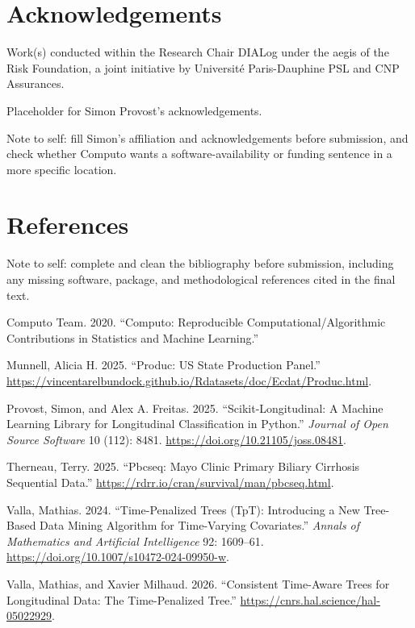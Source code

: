\documentclass[
  letterpaper,
  DIV=11,
  numbers=noendperiod]{scrartcl}
\newlength{\cslhangindent}
\newenvironment{CSLReferences}[2] %
 {\begin{list}{}{%
  \setlength{\itemindent}{0pt}
  \setlength{\leftmargin}{0pt}
  \setlength{\parsep}{0pt}
  \ifodd #1
   \setlength{\leftmargin}{\cslhangindent}
   \setlength{\itemindent}{-1\cslhangindent}
  \fi
  \setlength{\itemsep}{#2\baselineskip}}}
 {\end{list}}
\begin{document}
\section{Acknowledgements}\label{acknowledgements}

Work(s) conducted within the Research Chair DIALog under the aegis of
the Risk Foundation, a joint initiative by Université Paris-Dauphine PSL
and CNP Assurances.

Placeholder for Simon Provost's acknowledgements.

{Note to self: fill Simon's affiliation and acknowledgements before
submission, and check whether Computo wants a software-availability or
funding sentence in a more specific location.}

\section*{References}\label{references}

{Note to self: complete and clean the bibliography before submission,
including any missing software, package, and methodological references
cited in the final text.}

\label{refs}
\begin{CSLReferences}{1}{0}
Computo Team. 2020. {``Computo: Reproducible Computational/Algorithmic
Contributions in Statistics and Machine Learning.''}

Munnell, Alicia H. 2025. {``Produc: US State Production Panel.''}
\url{https://vincentarelbundock.github.io/Rdatasets/doc/Ecdat/Produc.html}.

Provost, Simon, and Alex A. Freitas. 2025. {``Scikit-Longitudinal: A
Machine Learning Library for Longitudinal Classification in Python.''}
\emph{Journal of Open Source Software} 10 (112): 8481.
\url{https://doi.org/10.21105/joss.08481}.

Therneau, Terry. 2025. {``Pbcseq: Mayo Clinic Primary Biliary Cirrhosis
Sequential Data.''} \url{https://rdrr.io/cran/survival/man/pbcseq.html}.

Valla, Mathias. 2024. {``Time-Penalized Trees ({TpT}): Introducing a New
Tree-Based Data Mining Algorithm for Time-Varying Covariates.''}
\emph{Annals of Mathematics and Artificial Intelligence} 92: 1609--61.
\url{https://doi.org/10.1007/s10472-024-09950-w}.

Valla, Mathias, and Xavier Milhaud. 2026. {``Consistent Time-Aware Trees
for Longitudinal Data: The Time-Penalized Tree.''}
\url{https://cnrs.hal.science/hal-05022929}.

\end{CSLReferences}
\end{document}
